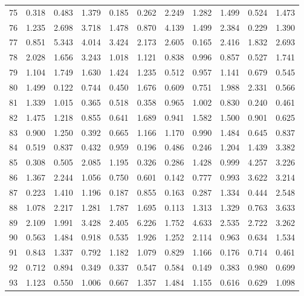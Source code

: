 \begin{tabular}{lrrrrrrrrrr}
75  &  0.318 &  0.483 &  1.379 &  0.185 &  0.262 &  2.249 &  1.282 &  1.499 &  0.524 &  1.473 \\
76  &  1.235 &  2.698 &  3.718 &  1.478 &  0.870 &  4.139 &  1.499 &  2.384 &  0.229 &  1.390 \\
77  &  0.851 &  5.343 &  4.014 &  3.424 &  2.173 &  2.605 &  0.165 &  2.416 &  1.832 &  2.693 \\
78  &  2.028 &  1.656 &  3.243 &  1.018 &  1.121 &  0.838 &  0.996 &  0.857 &  0.527 &  1.741 \\
79  &  1.104 &  1.749 &  1.630 &  1.424 &  1.235 &  0.512 &  0.957 &  1.141 &  0.679 &  0.545 \\
80  &  1.499 &  0.122 &  0.744 &  0.450 &  1.676 &  0.609 &  0.751 &  1.988 &  2.331 &  0.566 \\
81  &  1.339 &  1.015 &  0.365 &  0.518 &  0.358 &  0.965 &  1.002 &  0.830 &  0.240 &  0.461 \\
82  &  1.475 &  1.218 &  0.855 &  0.641 &  1.689 &  0.941 &  1.582 &  1.500 &  0.901 &  0.625 \\
83  &  0.900 &  1.250 &  0.392 &  0.665 &  1.166 &  1.170 &  0.990 &  1.484 &  0.645 &  0.837 \\
84  &  0.519 &  0.837 &  0.432 &  0.959 &  0.196 &  0.486 &  0.246 &  1.204 &  1.439 &  3.382 \\
85  &  0.308 &  0.505 &  2.085 &  1.195 &  0.326 &  0.286 &  1.428 &  0.999 &  4.257 &  3.226 \\
86  &  1.367 &  2.244 &  1.056 &  0.750 &  0.601 &  0.142 &  0.777 &  0.993 &  3.622 &  3.214 \\
87  &  0.223 &  1.410 &  1.196 &  0.187 &  0.855 &  0.163 &  0.287 &  1.334 &  0.444 &  2.548 \\
88  &  1.078 &  2.217 &  1.281 &  1.787 &  1.695 &  0.113 &  1.313 &  1.329 &  0.763 &  3.633 \\
89  &  2.109 &  1.991 &  3.428 &  2.405 &  6.226 &  1.752 &  4.633 &  2.535 &  2.722 &  3.262 \\
90  &  0.563 &  1.484 &  0.918 &  0.535 &  1.926 &  1.252 &  2.114 &  0.963 &  0.634 &  1.534 \\
91  &  0.843 &  1.337 &  0.792 &  1.182 &  1.079 &  0.829 &  1.166 &  0.176 &  0.714 &  0.461 \\
92  &  0.712 &  0.894 &  0.349 &  0.337 &  0.547 &  0.584 &  0.149 &  0.383 &  0.980 &  0.699 \\
93  &  1.123 &  0.550 &  1.006 &  0.667 &  1.357 &  1.484 &  1.155 &  0.616 &  0.629 &  1.098 \\

\end{tabular}
